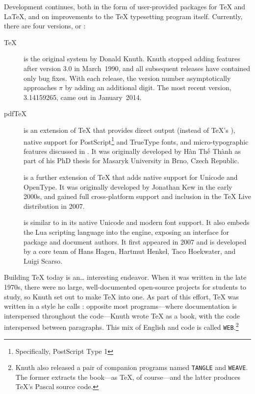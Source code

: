 Development continues,
both in the form of user-provided packages for \TeX{} and \LaTeX{},
and on improvements to the \TeX{} typesetting program itself.
Currently, there are four versions, or :
\begin{description}
\item[\TeX] is the original system by Donald Knuth.
Knuth stopped adding features after version 3.0 in March~1990,
and all subsequent releases have contained only bug fixes.
With each release, the version number asymptotically approaches $\pi$
by adding an additional digit.
The most recent version, 3.14159265, came out in January~2014.

\item[pdf\TeX] is an extension of \TeX{} that provides direct 
    output (instead of \TeX's ),
    native support for PostScript\footnote{%
    Specifically, PostScript Type 1}
    and TrueType fonts,
    and micro-typographic features discussed in .
    It was originally developed by
    Hàn Thế Thành
    as part of his PhD thesis
    for Masaryk University in Brno, Czech Republic.\punckern{}

\item[\XeTeX] is a further extension of \TeX{} that adds native support for
    Unicode and OpenType.
    It was originally developed by Jonathan Kew in the early 2000s,
    and gained full cross-platform support and inclusion in the \TeX{} Live
    distribution in 2007.\punckern{}

\item[\LuaTeX] is similar to \XeTeX{} in its native Unicode and modern font support.
    It also embeds the Lua scripting language into the engine,
    exposing an interface for package and document authors.
    It first appeared in 2007 and is developed by a core team of
    Hans Hagen, Hartmut Henkel, Taco Hoekwater,
    and Luigi Scarso.\punckern{}
\end{description}

Building \TeX{} today is an\ldots{} interesting endeavor.
When it was written in the late 1970s,
there were no large, well-documented open-source projects for students to study,
so Knuth set out to make \TeX{} into one.
As part of this effort, \TeX{} was written in a style he calls
: opposite most programs---where
documentation is interspersed throughout the code---Knuth wrote \TeX{} as a book,
with the code interspersed between paragraphs.
This mix of English and code is called \texttt{WEB}.\punckern\footnote{Knuth
also released a pair of companion programs named
\texttt{TANGLE} and \texttt{WEAVE}.
The former extracts the book---as \TeX, of course---and the latter
produces \TeX's Pascal source code.}

